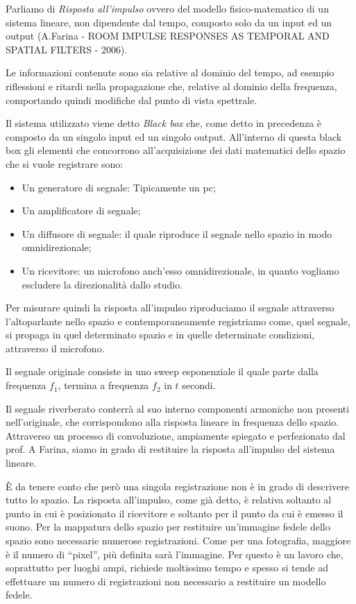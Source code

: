 Parliamo di \textit{Risposta all’impulso} ovvero del modello fisico-matematico di un sistema lineare, non dipendente dal tempo, composto solo da un input ed un output (A.Farina - ROOM IMPULSE RESPONSES AS TEMPORAL AND SPATIAL FILTERS - 2006).

Le informazioni contenute sono sia relative al dominio del tempo, ad esempio riflessioni e ritardi nella propagazione che, relative al dominio della frequenza, comportando quindi modifiche dal punto di vista spettrale.

Il sistema utilizzato viene detto \textit{Black box} che, come detto in precedenza è composto da un singolo input ed un singolo output. All’interno di questa black box gli elementi che concorrono all’acquisizione dei dati matematici dello spazio che si vuole registrare sono:
\begin{itemize}
\item Un generatore di segnale: Tipicamente un pc;
\item Un amplificatore di segnale;
\item Un diffusore di segnale: il quale riproduce il segnale nello spazio in modo omnidirezionale;
\item Un ricevitore: un microfono anch’esso omnidirezionale, in quanto vogliamo escludere la direzionalità dallo studio.
\end{itemize}
Per misurare quindi la risposta all'impulso riproduciamo il segnale attraverso l’altoparlante nello spazio e contemporaneamente registriamo come, quel segnale, si propaga in quel determinato spazio e in quelle determinate condizioni, attraverso il microfono.

Il segnale originale consiste in uno sweep esponenziale il quale parte dalla frequenza $f_1$, termina a frequenza $f_2$ in $t$ secondi.

Il segnale riverberato conterrà al suo interno componenti armoniche non presenti nell’originale, che corrispondono alla risposta lineare in frequenza dello spazio.
Attraverso un processo di convoluzione, ampiamente spiegato e perfezionato dal prof. A Farina, siamo in grado di restituire la risposta all'impulso del sistema lineare.

È da tenere conto che però una singola registrazione non è in grado di descrivere tutto lo spazio. La risposta all’impulso, come già detto, è relativa soltanto al punto in cui è posizionato il ricevitore e soltanto per il punto da cui è emesso il suono. Per la mappatura dello spazio per restituire un'immagine fedele dello spazio sono necessarie numerose registrazioni. Come per una fotografia, maggiore è il numero di “pixel”, più definita sarà l’immagine. Per questo è un lavoro che, soprattutto per luoghi ampi, richiede moltissimo tempo e spesso si tende ad effettuare un numero di registrazioni non necessario a restituire un modello fedele.

